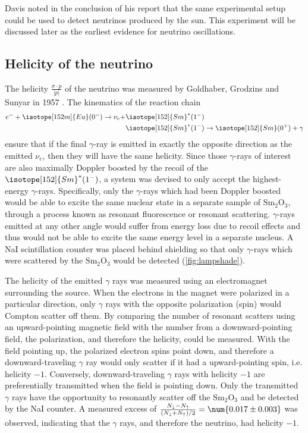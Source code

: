 Davis noted in the conclusion of his report that the same experimental setup
could be used to detect neutrinos produced by the sun.
This experiment will be discussed later as the earliest evidence
for neutrino oscillations.

\subsection{Helicity of the neutrino}
\label{subsec:helicity}

The helicity $\frac{\sigma\cdot p}{\vert p\vert}$ of the neutrino was measured by
Goldhaber, Grodzins and Sunyar in 1957 \cite{helicity_measurement,helicity_review}.
The kinematics of the reaction chain
\begin{align}\label{eq:lampshade}
    \begin{split}
        e^- + \isotope[152m]{Eu}(0^-) \to \nu_e
        + & \isotope[152]{Sm}^*(1^-) \\
          & \isotope[152]{Sm}^*(1^-) \to \isotope[152]{Sm}(0^+) + \gamma
    \end{split}
\end{align}
ensure that if the final $\gamma$-ray is emitted
in exactly the opposite direction as the emitted $\nu_e$,
then they will have the same helicity.
Since those $\gamma$-rays of interest
are also maximally Doppler boosted by the recoil of the $\isotope[152]{Sm}^*(1^-)$,
a system was devised to only accept the highest-energy $\gamma$-rays.
Specifically, only the $\gamma$-rays which had been Doppler boosted
would be able to excite the same nuclear state in a separate sample of
$\text{Sm}_2\text{O}_3$,
through a process known as resonant fluorescence or resonant scattering.
$\gamma$-rays emitted at any other angle would suffer from energy loss
due to recoil effects
and thus would not be able to excite the same energy level in a separate nucleus.
A NaI scintillation counter was placed behind shielding
so that only $\gamma$-rays which were scattered by the $\text{Sm}_2\text{O}_3$
would be detected (\cref{fig:lampshade}).

The helicity of the emitted $\gamma$ rays was measured
using an electromagnet surrounding the  source.
When the electrons in the magnet were polarized in a particular direction,
only $\gamma$ rays with the opposite polarization (spin)
would Compton scatter off them.
By comparing the number of resonant scatters
using an upward-pointing magnetic field
with the number from a downward-pointing field,
the polarization, and therefore the helicity, could be measured.
With the field pointing up, the polarized electron spins point down,
and therefore a downward-traveling $\gamma$ ray
would only scatter if it had a upward-pointing spin, i.e. helicity $-1$.
Conversely, downward-traveling $\gamma$ rays
with helicity $-1$ are preferentially transmitted
when the field is pointing down.
Only the transmitted $\gamma$ rays have the opportunity to
resonantly scatter off the $\text{Sm}_2\text{O}_3$
and be detected by the NaI counter.
A measured excess of
$\frac{N_{\downarrow}-N_{\uparrow}}{(N_{\downarrow}+N_{\uparrow})/2} =
\num{0.017\pm0.003}$
was observed,
indicating that the $\gamma$ rays, and therefore the neutrino,
had helicity $-1$.

